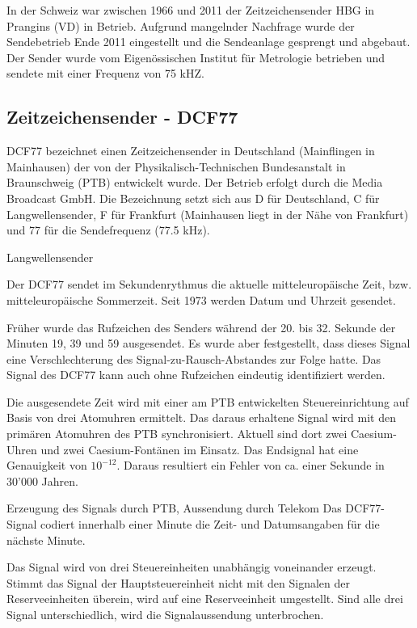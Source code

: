 In der Schweiz war zwischen 1966 und 2011 der Zeitzeichensender HBG in Prangins (VD) in Betrieb. Aufgrund mangelnder Nachfrage wurde der Sendebetrieb Ende 2011 eingestellt und die Sendeanlage gesprengt und abgebaut. Der Sender wurde vom Eigenössischen Institut für Metrologie betrieben und sendete mit einer Frequenz von 75 kHZ.

\subsection{Zeitzeichensender - DCF77}
DCF77 bezeichnet einen Zeitzeichensender in Deutschland (Mainflingen in Mainhausen) der von der Physikalisch-Technischen Bundesanstalt in Braunschweig (PTB) entwickelt wurde. Der Betrieb erfolgt durch die Media Broadcast GmbH. Die Bezeichnung setzt sich aus D für Deutschland, C für Langwellensender, F für Frankfurt (Mainhausen liegt in der Nähe von Frankfurt) und 77 für die Sendefrequenz (77.5 kHz).

Langwellensender

Der DCF77 sendet im Sekundenrythmus die aktuelle mitteleuropäische Zeit, bzw. mitteleuropäische Sommerzeit. Seit 1973 werden Datum und Uhrzeit gesendet.

Früher wurde das Rufzeichen des Senders während der 20. bis 32. Sekunde der Minuten 19, 39 und 59 ausgesendet. Es wurde aber festgestellt, dass dieses Signal eine Verschlechterung des Signal-zu-Rausch-Abstandes zur Folge hatte. Das Signal des DCF77 kann auch ohne Rufzeichen eindeutig identifiziert werden.

Die ausgesendete Zeit wird mit einer am PTB entwickelten Steuereinrichtung auf Basis von drei Atomuhren ermittelt. Das daraus erhaltene Signal wird mit den primären Atomuhren des PTB synchronisiert. Aktuell sind dort zwei Caesium-Uhren und zwei Caesium-Fontänen im Einsatz. Das Endsignal hat eine Genauigkeit von $10^{-12}$. Daraus resultiert ein Fehler von ca. einer Sekunde in 30'000 Jahren.

Erzeugung des Signals durch PTB, Aussendung durch Telekom
Das DCF77-Signal codiert innerhalb einer Minute die Zeit- und Datumsangaben für die nächste Minute. 

Das Signal wird von drei Steuereinheiten unabhängig voneinander erzeugt. Stimmt das Signal der Hauptsteuereinheit nicht mit den Signalen der Reserveeinheiten überein, wird auf eine Reserveeinheit umgestellt. Sind alle drei Signal unterschiedlich, wird die Signalaussendung unterbrochen.


